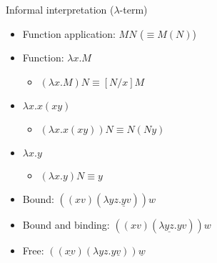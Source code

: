 \documentclass{beamer}
\begin{document}

\begin{frame}

  \begin{block}{Informal interpretation ($\lambda$-term)}
    \begin{itemize}
    \item
      Function application: $MN$ \hfill ($\equiv M(N)$)
    \item
      Function: $\lambda{x}.M$
      \begin{itemize}
      \item
        $(\lambda{x}.M)N \equiv [N/x]M$
      \end{itemize}
    \end{itemize}
  \end{block}
\end{frame}


\begin{frame}

  \begin{examples}
    \begin{itemize}
    \item
      $\lambda{x}.x(xy)$
      \begin{itemize}
      \item
        $(\lambda{x}.x(xy))N \equiv N(Ny)$
      \end{itemize}
    \item
      $\lambda{x}.y$
      \begin{itemize}
      \item
        $(\lambda{x}.y)N \equiv y$
      \end{itemize}
    \end{itemize}
  \end{examples}
\end{frame}


\begin{frame}

  \begin{definition}
    \begin{itemize}
    \item
      Bound: $((xv)(\lambda{yz}.\underline{y}v))w$
    \item
      Bound and binding: $((xv)(\lambda{\underline{yz}}.yv))w$
    \item
      Free:
      $((\underline{xv})(\lambda{yz}.y\underline{v}))\underline{w}$
    \end{itemize}
  \end{definition}
\end{frame}
\end{document}
